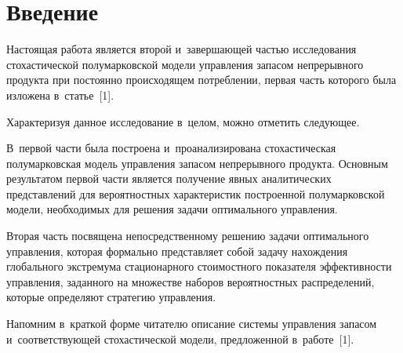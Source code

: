   



\thispagestyle{headings}

\begin{multicols}{2}

\label{st\stat}

\section{Введение}

  Настоящая работа является второй и~за\-вер\-шающей частью исследования 
стохастической полумарковской модели управ\-ле\-ния запасом непрерывного 
продукта при по\-сто\-ян\-но происходящем по\-треб\-ле\-нии, пер\-вая часть которого 
была изложена в~\mbox{статье}~[1].
  
   Характеризуя данное исследование в~целом, можно отметить сле\-ду\-ющее. 

В~первой части была построена и~проанализирована стохастическая 
полумарковская модель управ\-ле\-ния запасом непрерывного продукта. 
Основным результатом первой час\-ти является получение явных аналитических 
пред\-став\-ле\-ний для вероятностных характеристик по\-стро\-ен\-ной полумарковской 
модели, необходимых для решения задачи оптимального управ\-ле\-ния. 

Вторая 
часть по\-свя\-ще\-на непосредственному решению задачи оптимального 
управ\-ле\-ния, которая формально пред\-став\-ля\-ет собой задачу на\-хож\-де\-ния 
глобального экстремума стационарного стоимостного показателя 
эффективности управ\-ле\-ния, заданного на множестве наборов вероятностных 
распределений, которые определяют стратегию управ\-ления.
  
  Напомним в~краткой форме читателю описание сис\-те\-мы управ\-ле\-ния запасом 
и~соответствующей стохастической модели, пред\-ло\-жен\-ной в~работе~[1]. 


\end{multicols}
